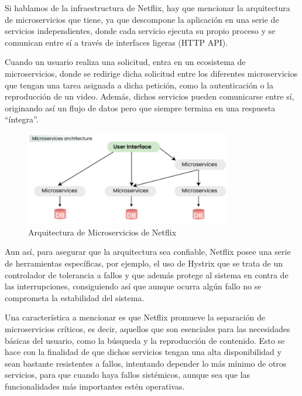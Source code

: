 \documentclass[12pt,a4paper]{article}
\begin{document}
    Si hablamos de la infraestructura de Netflix, hay que mencionar la arquitectura de microservicios que tiene, ya que descompone la aplicación en una serie de servicios independientes, donde cada servicio ejecuta su propio proceso y se comunican entre sí a través de interfaces ligeras (HTTP API).

    Cuando un usuario realiza una solicitud, entra en un ecosistema de microservicios, donde se redirige dicha solicitud entre los diferentes microservicios que tengan una tarea asignada a dicha petición, como la autenticación o la reproducción de un video. Además, dichos servicios pueden comunicarse entre sí, originando así un flujo de datos pero que siempre termina en una respuesta “íntegra”. \cite{gfg2024b}

    \begin{figure}[H]
        \centering
        \includegraphics[width=0.8\textwidth]{./img/arquitectura_microservicios_netflix.png}
        \caption{Arquitectura de Microservicios de Netflix}
        \label{fig:netflix_microservices}
    \end{figure}

    Aun así, para asegurar que la arquitectura sea confiable, Netflix posee una serie de herramientas específicas, por ejemplo, el uso de Hystrix que se trata de un controlador de tolerancia a fallos y que además protege al sistema en contra de las interrupciones, consiguiendo así que aunque ocurra algún fallo no se comprometa la estabilidad del sistema.

    Una característica a mencionar es que Netflix promueve la separación de microservicios críticos, es decir, aquellos que son esenciales para las necesidades básicas del usuario, como la búsqueda y la reproducción de contenido. Esto se hace con la finalidad de que dichos servicios tengan una alta disponibilidad y sean bastante resistentes a fallos, intentando depender lo más mínimo de otros servicios, para que cuando haya fallos sistémicos, aunque sea que las funcionalidades más importantes estén operativas.
\end{document}
